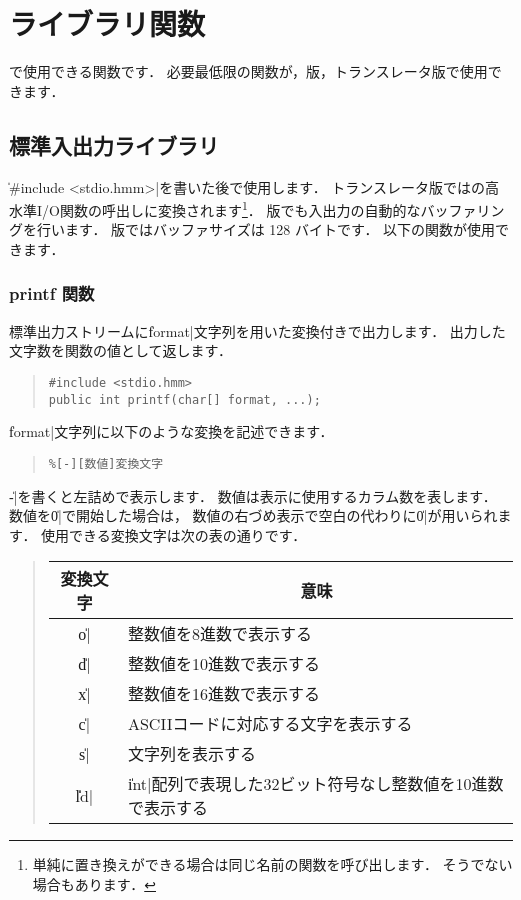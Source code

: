 %
%
\chapter{ライブラリ関数}

\cmml で使用できる関数です．
必要最低限の関数が，{\tacos}版，{\cl}トランスレータ版で使用できます．

\section{標準入出力ライブラリ}
\label{chap4:stdio}

\|#include <stdio.hmm>|を書いた後で使用します．
トランスレータ版では{\cl}の高水準I/O関数の呼出しに変換されます\footnote{
単純に置き換えができる場合は同じ名前の{\cl}関数を呼び出します．
そうでない場合もあります．}．
{\tacos}版でも入出力の自動的なバッファリングを行います．
{\tacos}版ではバッファサイズは 128 バイトです．
以下の関数が使用できます．

\subsection{printf 関数}

標準出力ストリームに\|format|文字列を用いた変換付きで出力します．
出力した文字数を関数の値として返します．

\begin{quote}
\begin{verbatim}
#include <stdio.hmm>
public int printf(char[] format, ...);
\end{verbatim}
\end{quote}

\|format|文字列に以下のような変換を記述できます．

\begin{quote}
\begin{verbatim}
%[-][数値]変換文字
\end{verbatim}
\end{quote}

\|-|を書くと左詰めで表示します．
数値は表示に使用するカラム数を表します．
数値を\|0|で開始した場合は，
数値の右づめ表示で空白の代わりに\|0|が用いられます．
使用できる変換文字は次の表の通りです．

\begin{quote}
\begin{tabular}{c|l}
\multicolumn{1}{c|}{変換文字} & \multicolumn{1}{c}{意味} \\\hline
\|o| & 整数値を8進数で表示する \\
\|d| & 整数値を10進数で表示する \\
\|x| & 整数値を16進数で表示する \\
\|c| & ASCIIコードに対応する文字を表示する \\
\|s| & 文字列を表示する \\
\|%
\|ld|& \|int|配列で表現した32ビット符号なし整数値を10進数で表示する \\
\end{tabular}
\end{quote}

